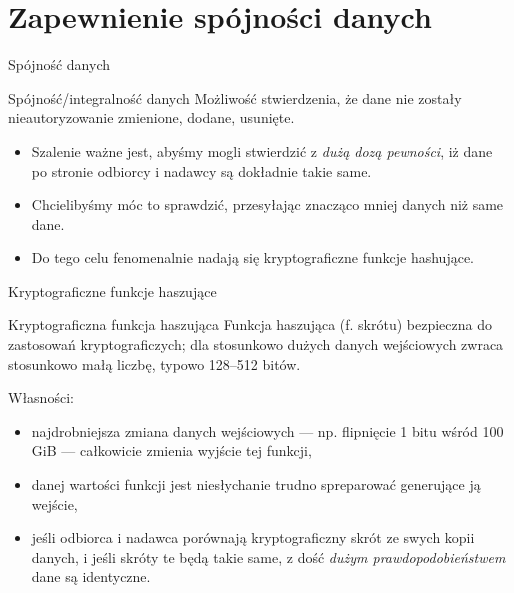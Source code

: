 \section{Zapewnienie spójności danych}

\begin{frame}{Spójność danych}
	
	\begin{alertblock}{Spójność/integralność danych}
		Możliwość stwierdzenia, że dane nie zostały nieautoryzowanie zmienione, dodane, usunięte.
	\end{alertblock}

	\begin{itemize}
		\item Szalenie ważne jest, abyśmy mogli stwierdzić z \emph{dużą dozą pewności}, iż dane po stronie odbiorcy i nadawcy są dokładnie takie same.
		
		\item Chcielibyśmy móc to sprawdzić, przesyłając znacząco mniej danych niż same dane.
		
		\item Do tego celu fenomenalnie nadają się kryptograficzne funkcje hashujące.
		
	\end{itemize}	

\end{frame}

\begin{frame}{Kryptograficzne funkcje haszujące}
	
	\begin{alertblock}{Kryptograficzna funkcja haszująca}
		Funkcja haszująca (f. skrótu) bezpieczna do zastosowań kryptograficzych; dla stosunkowo dużych danych wejściowych zwraca stosunkowo małą liczbę, typowo 128--512 bitów.
	\end{alertblock}
	
	Własności:\begin{itemize}
		\item najdrobniejsza zmiana danych wejściowych --- np. flipnięcie 1 bitu wśród 100 GiB --- całkowicie zmienia wyjście tej funkcji,
		\item danej wartości funkcji jest niesłychanie trudno spreparować generujące ją wejście,
		\item jeśli odbiorca i nadawca porównają kryptograficzny skrót ze swych kopii danych, i jeśli skróty te będą takie same, z dość \emph{dużym prawdopodobieństwem} dane są identyczne.
	\end{itemize}
	
\end{frame}

